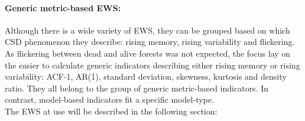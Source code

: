 \paragraph{Generic metric-based EWS:}
Although there is a wide variety of EWS, they can be grouped based on which CSD phenomenon they describe: rising memory, rising variability and \gls{flickering}. As flickering between dead and alive forests was not expected, the focus lay on the easier to calculate generic indicators describing either rising memory or rising variability: ACF-1, AR(1), standard deviation, skewness, kurtosis and density ratio. They all belong to the group of generic metric-based indicators. In contrast, model-based indicators fit a specific model-type.\\
The EWS at use will be described in the following section:\\
